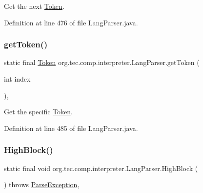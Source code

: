 Get the next \mbox{\hyperlink{classorg_1_1tec_1_1comp_1_1interpreter_1_1_token}{Token}}. 

Definition at line 476 of file Lang\+Parser.\+java.

\mbox{\label{classorg_1_1tec_1_1comp_1_1interpreter_1_1_lang_parser_a9933b5189ec4eff3b75fd415723829f1}} 
\subsubsection{\texorpdfstring{get\+Token()}{getToken()}}
{\footnotesize\ttfamily static final \mbox{\hyperlink{classorg_1_1tec_1_1comp_1_1interpreter_1_1_token}{Token}} org.\+tec.\+comp.\+interpreter.\+Lang\+Parser.\+get\+Token (\begin{DoxyParamCaption}\item[{int}]{index }\end{DoxyParamCaption})\hspace{0.3cm}{\ttfamily [inline]}, {\ttfamily [static]}}

Get the specific \mbox{\hyperlink{classorg_1_1tec_1_1comp_1_1interpreter_1_1_token}{Token}}. 

Definition at line 485 of file Lang\+Parser.\+java.

\mbox{\label{classorg_1_1tec_1_1comp_1_1interpreter_1_1_lang_parser_a47c719b70d38e1b2cda82b4ba337884c}} 
\subsubsection{\texorpdfstring{High\+Block()}{HighBlock()}}
{\footnotesize\ttfamily static final void org.\+tec.\+comp.\+interpreter.\+Lang\+Parser.\+High\+Block (\begin{DoxyParamCaption}{ }\end{DoxyParamCaption}) throws \mbox{\hyperlink{classorg_1_1tec_1_1comp_1_1interpreter_1_1_parse_exception}{Parse\+Exception}}\hspace{0.3cm}{\ttfamily [inline]}, {\ttfamily [static]}}




